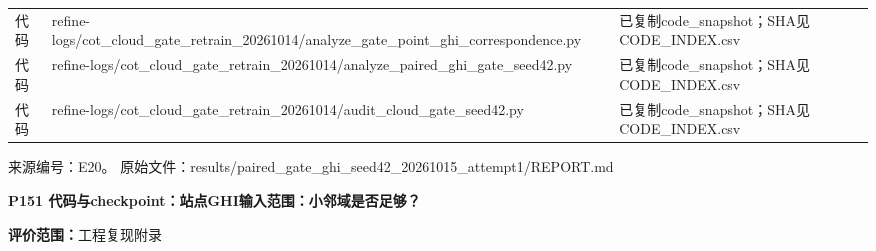 \documentclass[UTF8,a4paper,landscape,10pt]{ctexart}
\begin{document}
\begin{center}
\begin{adjustbox}{max totalheight=0.58\textheight,max width=\linewidth}
\begin{minipage}{\linewidth}
\begin{tabularx}{\linewidth}{>{\hsize=0.3500\hsize\raggedright\arraybackslash}X>{\hsize=1.9000\hsize\raggedright\arraybackslash}X>{\hsize=0.7500\hsize\raggedright\arraybackslash}X}
代码 & refine-logs/\allowbreak{}cot\_\allowbreak{}cloud\_\allowbreak{}gate\_\allowbreak{}retrain\_\allowbreak{}20261014/\allowbreak{}analyze\_\allowbreak{}gate\_\allowbreak{}point\_\allowbreak{}ghi\_\allowbreak{}correspondence.py & 已复制code\_\allowbreak{}snapshot；SHA见CODE\_\allowbreak{}INDEX.csv \\
代码 & refine-logs/\allowbreak{}cot\_\allowbreak{}cloud\_\allowbreak{}gate\_\allowbreak{}retrain\_\allowbreak{}20261014/\allowbreak{}analyze\_\allowbreak{}paired\_\allowbreak{}ghi\_\allowbreak{}gate\_\allowbreak{}seed42.py & 已复制code\_\allowbreak{}snapshot；SHA见CODE\_\allowbreak{}INDEX.csv \\
代码 & refine-logs/\allowbreak{}cot\_\allowbreak{}cloud\_\allowbreak{}gate\_\allowbreak{}retrain\_\allowbreak{}20261014/\allowbreak{}audit\_\allowbreak{}cloud\_\allowbreak{}gate\_\allowbreak{}seed42.py & 已复制code\_\allowbreak{}snapshot；SHA见CODE\_\allowbreak{}INDEX.csv \\
\bottomrule\end{tabularx}\end{minipage}\end{adjustbox}\end{center}
\vfill{\scriptsize\color{muted} 来源编号：E20。 原始文件：results/\allowbreak{}paired\_\allowbreak{}gate\_\allowbreak{}ghi\_\allowbreak{}seed42\_\allowbreak{}20261015\_\allowbreak{}attempt1/\allowbreak{}REPORT.md}\par
\clearpage
{\large\bfseries\color{ink} P151  代码与checkpoint：站点GHI输入范围：小邻域是否足够？}\par
{}\par
{\small\color{muted}\textbf{评价范围：}工程复现附录}\par\vspace{3mm}
\end{document}
